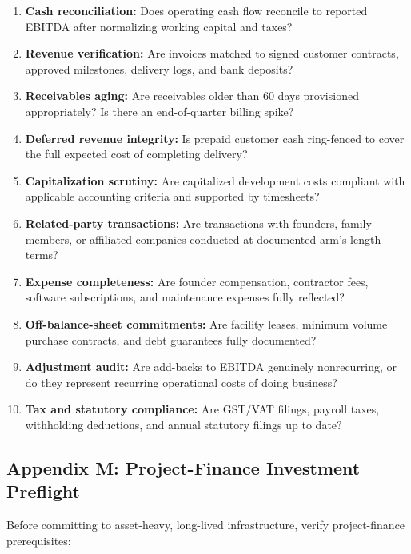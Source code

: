 \begin{enumerate}
    \item \textbf{Cash reconciliation:} Does operating cash flow reconcile to reported EBITDA after normalizing working capital and taxes?
    \item \textbf{Revenue verification:} Are invoices matched to signed customer contracts, approved milestones, delivery logs, and bank deposits?
    \item \textbf{Receivables aging:} Are receivables older than 60 days provisioned appropriately? Is there an end-of-quarter billing spike?
    \item \textbf{Deferred revenue integrity:} Is prepaid customer cash ring-fenced to cover the full expected cost of completing delivery?
    \item \textbf{Capitalization scrutiny:} Are capitalized development costs compliant with applicable accounting criteria and supported by timesheets?
    \item \textbf{Related-party transactions:} Are transactions with founders, family members, or affiliated companies conducted at documented arm's-length terms?
    \item \textbf{Expense completeness:} Are founder compensation, contractor fees, software subscriptions, and maintenance expenses fully reflected?
    \item \textbf{Off-balance-sheet commitments:} Are facility leases, minimum volume purchase contracts, and debt guarantees fully documented?
    \item \textbf{Adjustment audit:} Are add-backs to EBITDA genuinely nonrecurring, or do they represent recurring operational costs of doing business?
    \item \textbf{Tax and statutory compliance:} Are GST/VAT filings, payroll taxes, withholding deductions, and annual statutory filings up to date?
\end{enumerate}

\subsection{Appendix M: Project-Finance Investment Preflight}

Before committing to asset-heavy, long-lived infrastructure, verify project-finance prerequisites:

